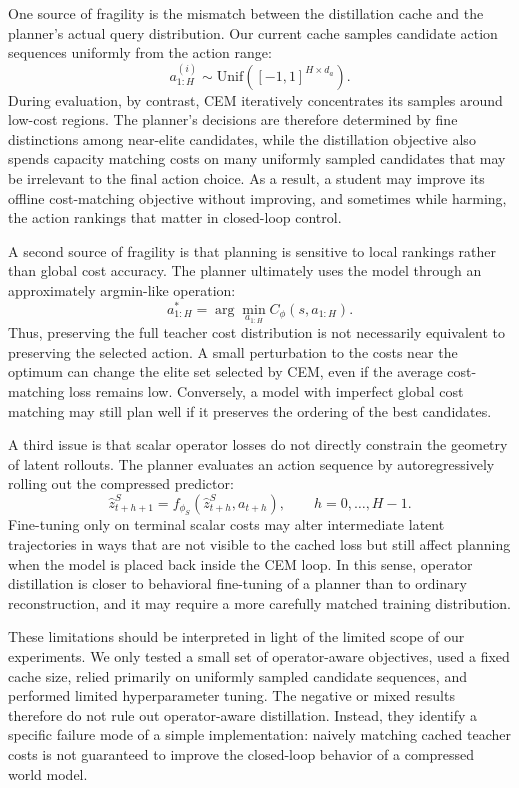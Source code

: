\documentclass[11pt]{article}
\begin{document}
One source of fragility is the mismatch between the distillation cache and the planner's actual query distribution. Our current cache samples candidate action sequences uniformly from the action range:
\[
    a_{1:H}^{(i)} \sim \mathrm{Unif}([-1,1]^{H \times d_a}).
\]
During evaluation, by contrast, CEM iteratively concentrates its samples around low-cost regions. The planner's decisions are therefore determined by fine distinctions among near-elite candidates, while the distillation objective also spends capacity matching costs on many uniformly sampled candidates that may be irrelevant to the final action choice. As a result, a student may improve its offline cost-matching objective without improving, and sometimes while harming, the action rankings that matter in closed-loop control.

A second source of fragility is that planning is sensitive to local rankings rather than global cost accuracy. The planner ultimately uses the model through an approximately argmin-like operation:
\[
    a^*_{1:H}
    =
    \arg\min_{a_{1:H}} C_\phi(s,a_{1:H}).
\]
Thus, preserving the full teacher cost distribution is not necessarily equivalent to preserving the selected action. A small perturbation to the costs near the optimum can change the elite set selected by CEM, even if the average cost-matching loss remains low. Conversely, a model with imperfect global cost matching may still plan well if it preserves the ordering of the best candidates.

A third issue is that scalar operator losses do not directly constrain the geometry of latent rollouts. The planner evaluates an action sequence by autoregressively rolling out the compressed predictor:
\[
    \hat z_{t+h+1}^{S}
    =
    f_{\phi_S}(\hat z_{t+h}^{S}, a_{t+h}),
    \qquad
    h=0,\dots,H-1.
\]
Fine-tuning only on terminal scalar costs may alter intermediate latent trajectories in ways that are not visible to the cached loss but still affect planning when the model is placed back inside the CEM loop. In this sense, operator distillation is closer to behavioral fine-tuning of a planner than to ordinary reconstruction, and it may require a more carefully matched training distribution.

These limitations should be interpreted in light of the limited scope of our experiments. We only tested a small set of operator-aware objectives, used a fixed cache size, relied primarily on uniformly sampled candidate sequences, and performed limited hyperparameter tuning. The negative or mixed results therefore do not rule out operator-aware distillation. Instead, they identify a specific failure mode of a simple implementation: naively matching cached teacher costs is not guaranteed to improve the closed-loop behavior of a compressed world model.
\end{document}
